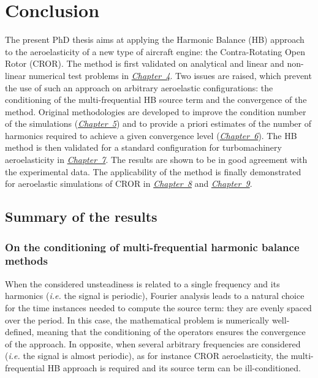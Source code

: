 
\chapter*{Conclusion}

The present PhD thesis aims at applying the Harmonic Balance (HB) approach to the 
aeroelasticity of a new type of aircraft engine: 
the Contra-Rotating Open Rotor (CROR). The method is 
first validated on analytical and linear and non-linear 
numerical test problems in \hyperref[cha:validation_hb]{\emph{Chapter~4}}. 
Two issues are raised, which prevent the use of such an approach 
on arbitrary aeroelastic configurations: the conditioning of
the multi-frequential HB source term and the
convergence of the method. Original methodologies are developed 
to improve the condition number of the simulations 
(\hyperref[cha:limitations_condition_number]{\emph{Chapter~5}})
and to provide a priori estimates of the number of harmonics 
required to achieve a given convergence level
(\hyperref[cha:limitations_convergence]{\emph{Chapter~6}}). 
The HB method is then validated for a standard configuration 
for turbomachinery aeroelasticity in \hyperref[cha:stcf11]{\emph{Chapter~7}}. 
The results are shown to be in good agreement 
with the experimental data. The applicability of the method 
is finally demonstrated for aeroelastic 
simulations of CROR
in \hyperref[cha:dream_ls_isolated]{\emph{Chapter~8}}
and \hyperref[cha:dream_hs_isolated]{\emph{Chapter~9}}.

\section*{Summary of the results}

\subsection*{On the conditioning of multi-frequential harmonic balance methods}

When the considered unsteadiness is related to a single frequency and its
harmonics (\emph{i.e.} the signal is periodic), 
Fourier analysis leads to a natural choice for the time instances
needed to compute the source term:
they are evenly spaced over the period. In this case, the mathematical
problem is numerically well-defined, meaning that the conditioning of
the operators ensures the convergence of the approach.
In opposite, when several arbitrary frequencies are 
considered (\emph{i.e.} the signal is almost periodic), as for instance CROR
aeroelasticity, the multi-frequential HB approach
is required and its source term can be ill-conditioned.

